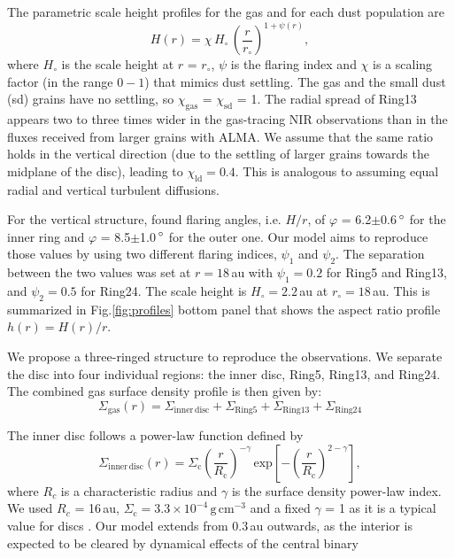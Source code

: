 \documentclass[fleqn,usenatbib,useAMS]{mnras}
\begin{document}
The parametric scale height profiles for the gas and for each dust population are 
\begin{equation}
    \label{scale}
  H(r)=\chi \, H_{\circ} \,\left( \frac{r}{r_{\circ}}\right)^{1+\psi(r)},
\end{equation}
where $H_\circ$ is the scale height at $r$ = $r_\circ$, $\psi$ is the flaring index and $\chi$ is a scaling factor (in the range $0-1$) that mimics dust settling. The gas and the small dust (sd) grains have no settling, so $\chi_{\mathrm{gas}}$ = $\chi_{\mathrm{sd}}$ = 1. The radial spread of Ring13 appears two to three times wider in the gas-tracing NIR observations than in the fluxes received from larger grains with ALMA. We assume that the same ratio holds in the vertical direction (due to the settling of larger grains towards the midplane of the disc), leading to $\chi_{\mathrm{ld}}=0.4$. This is analogous to assuming equal radial and vertical turbulent diffusions.

For the vertical structure, \citet{dOrazi} found flaring angles, i.e. $H/r$, of $\varphi$ = 6.2$\pm$0.6\,$\hbox{$^\circ$}$ for the inner ring and $\varphi$ = 8.5$\pm$1.0\,$\hbox{$^\circ$}$ for the outer one. Our model aims to reproduce those values by using two different flaring indices, $\psi_1$ and $\psi_2$. The separation between the two values was set at $r = 18$\,au with $\psi_1=0.2$ for Ring5 and Ring13, and $\psi_2=0.5$ for Ring24. The scale height is $H_\circ = 2.2$\,au at $r_\circ = 18$\,au. This is summarized in Fig.\ref{fig:profiles} bottom panel that shows the aspect ratio profile $h(r)=H(r)/r$. 

We propose a three-ringed structure to reproduce the observations. We separate the disc into four individual regions: the inner disc, Ring5, Ring13, and Ring24. The combined gas surface density profile is then given by:
\begin{equation}
  \Sigma_{\mathrm{gas}}(r) = \Sigma_{\mathrm{inner\,disc}} + \Sigma_{\mathrm{Ring5}} + \Sigma_{\mathrm{Ring13}} + \Sigma_{\mathrm{Ring24}}
\end{equation}

The inner disc follows a power-law function defined by
\begin{equation}
  \Sigma_{\mathrm{inner\,disc}}(r) =\Sigma_\mathrm{c} \left(\frac{r}{R_\mathrm{c}}\right)^{-\gamma}  \, \mathrm{exp}\left[-\left(\frac{r}{R_\mathrm{c}}\right)^{2-\gamma}\right],
\end{equation}
where $R_c$ is a characteristic radius and $\gamma$ is the surface density power-law index. We used $R_c$ = 16\,au, $\Sigma_\mathrm{c} =3.3\times10^{-4}$\,$\mathrm{g\,cm^{-3}}$ and a fixed $\gamma$ = 1 as it is a typical value for discs \citep{Andrews_2009,Andrews_2010}. Our model extends from 0.3\,au outwards, as the interior is expected to be cleared by dynamical effects of the central binary \citep{Art_Lu}
\end{document}
